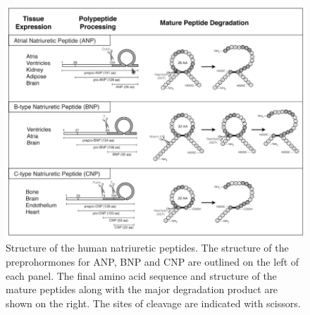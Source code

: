 \documentclass[14pt,a4paper,onecolumn]{extarticle}
\begin{document}


\begin{figure}      \centering      \includegraphics[scale=0.4]{../../images/NP_structure.png}      \caption{Structure of the human natriuretic peptides. The structure of the preprohormones for ANP, BNP and CNP are outlined on the left of each panel. The final amino acid sequence and structure of the mature peptides along with the major degradation product are shown on the right. The sites of cleavage are indicated with scissors.}      \label{NP_structure}  \end{figure}

\end{document}
